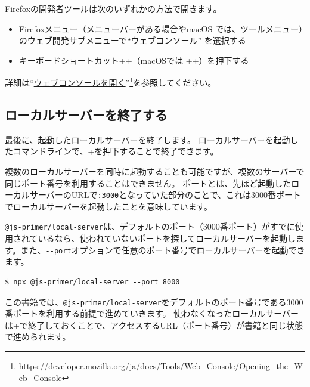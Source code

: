 Firefoxの開発者ツールは次のいずれかの方法で開きます。

\begin{itemize}
\item
  Firefoxメニュー（メニューバーがある場合やmacOS
  では、ツールメニュー）のウェブ開発サブメニューで``ウェブコンソール''
  を選択する
\item
  キーボードショートカット++（macOSでは
  ++）を押下する
\end{itemize}

詳細は``\href{https://developer.mozilla.org/ja/docs/Tools/Web_Console/Opening_the_Web_Console}{ウェブコンソールを開く}''\footnote{\url{https://developer.mozilla.org/ja/docs/Tools/Web_Console/Opening_the_Web_Console}}を参照してください。

\hypertarget{close-js-primer-local-server}{%
\subsection{ローカルサーバーを終了する}\label{close-js-primer-local-server}}

最後に、起動したローカルサーバーを終了します。
ローカルサーバーを起動したコマンドラインで、+を押下することで終了できます。

複数のローカルサーバーを同時に起動することも可能ですが、複数のサーバーで同じポート番号を利用することはできません。
ポートとは、先ほど起動したローカルサーバーのURLで\texttt{:3000}となっていた部分のことで、これは3000番ポートでローカルサーバーを起動したことを意味しています。

\texttt{@js-primer/local-server}は、デフォルトのポート（3000番ポート）がすでに使用されているなら、使われていないポートを探してローカルサーバーを起動します。また、\texttt{-\/-port}オプションで任意のポート番号でローカルサーバーを起動できます。

\begin{lstlisting}
$ npx @js-primer/local-server --port 8000
\end{lstlisting}

この書籍では、\texttt{@js-primer/local-server}をデフォルトのポート番号である3000番ポートを利用する前提で進めていきます。
使わなくなったローカルサーバーは+で終了しておくことで、アクセスするURL（ポート番号）が書籍と同じ状態で進められます。

